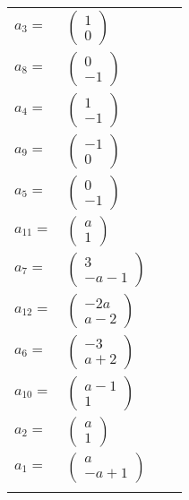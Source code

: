 \documentclass[1p]{elsarticle_modified}
\theoremstyle{definition}
\begin{document}
\begin{tabular}{m{7pt} m{180pt} m{7pt} m{180pt} }
\flushright $a_{3}=$&$\begin{pmatrix}1\\0\end{pmatrix}$ \\
\flushright $a_{8}=$&$\begin{pmatrix}0\\-1\end{pmatrix}$ \\
\flushright $a_{4}=$&$\begin{pmatrix}1\\-1\end{pmatrix}$ \\
\flushright $a_{9}=$&$\begin{pmatrix}-1\\0\end{pmatrix}$ \\
\flushright $a_{5}=$&$\begin{pmatrix}0\\-1\end{pmatrix}$ \\
\flushright $a_{11}=$&$\begin{pmatrix}a\\1\end{pmatrix}$ \\
\flushright $a_{7}=$&$\begin{pmatrix}3\\- a-1\end{pmatrix}$ \\
\flushright $a_{12}=$&$\begin{pmatrix}-2 a\\a-2\end{pmatrix}$ \\
\flushright $a_{6}=$&$\begin{pmatrix}-3\\a+2\end{pmatrix}$ \\
\flushright $a_{10}=$&$\begin{pmatrix}a-1\\1\end{pmatrix}$ \\
\flushright $a_{2}=$&$\begin{pmatrix}a\\1\end{pmatrix}$ \\
\flushright $a_{1}=$&$\begin{pmatrix}a\\- a+1\end{pmatrix}$\\&\end{tabular}
\end{document}
